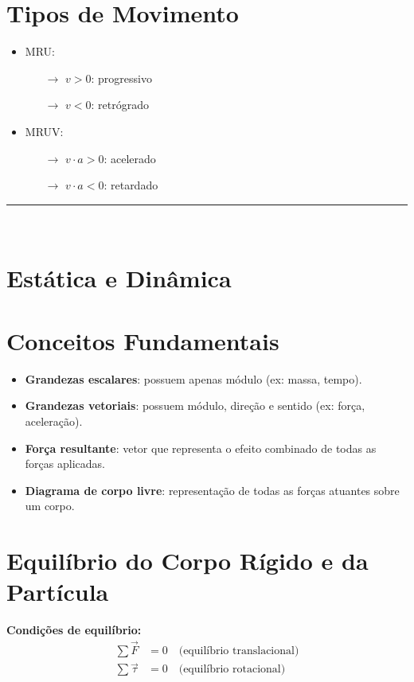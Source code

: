\documentclass[a4paper,12pt]{article}
\begin{document}
\begin{multicols}{2}
\section{Tipos de Movimento}
\begin{itemize}
  \item MRU:
    \begin{itemize}
      \item[$\rightarrow$] $v > 0$: progressivo
      \item[$\rightarrow$] $v < 0$: retrógrado
    \end{itemize}
  \item MRUV:
    \begin{itemize}
      \item[$\rightarrow$] $v \cdot a > 0$: acelerado
      \item[$\rightarrow$] $v \cdot a < 0$: retardado
    \end{itemize}
\end{itemize}

\noindent\rule{\linewidth}{1pt}\\
\section{Estática e Dinâmica}

\section{Conceitos Fundamentais}

\begin{itemize}
  \item \textbf{Grandezas escalares}: possuem apenas módulo (ex: massa, tempo).
  \item \textbf{Grandezas vetoriais}: possuem módulo, direção e sentido (ex: força, aceleração).
  \item \textbf{Força resultante}: vetor que representa o efeito combinado de todas as forças aplicadas.
  \item \textbf{Diagrama de corpo livre}: representação de todas as forças atuantes sobre um corpo.
\end{itemize}

\section{Equilíbrio do Corpo Rígido e da Partícula}

\textbf{Condições de equilíbrio:}
\begin{align*}
  \sum \vec{F} &= 0 \quad \text{(equilíbrio translacional)} \\
  \sum \vec{\tau} &= 0 \quad \text{(equilíbrio rotacional)}
\end{align*}


\end{multicols}
\end{document}
